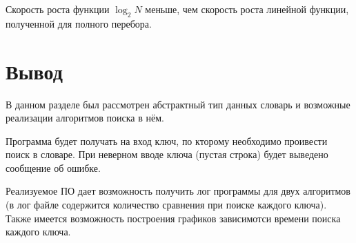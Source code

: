 Скорость роста функции $\log_2 N$ меньше, чем скорость роста линейной функции, полученной для полного перебора.

\section{Вывод}
В данном разделе был рассмотрен абстрактный тип данных словарь и возможные реализации алгоритмов поиска в нём.

Программа будет получать на вход ключ, по кторому необходимо проивести поиск в словаре. При неверном вводе ключа (пустая строка) будет выведено сообщение об ошибке.

Реализуемое ПО дает возможность получить лог программы для двух алгоритмов (в лог файле содержится количество сравнения при поиске каждого ключа). Также имеется возможность построения графиков зависимотси времени поиска каждого ключа.